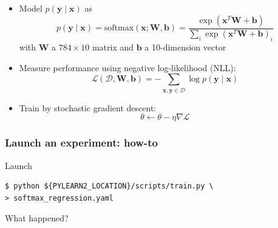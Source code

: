 \documentclass[mathserif, xcolor=dvipsnames]{beamer}
\begin{document}
\begin{frame}[t]
    \begin{itemize}\addtolength{\itemsep}{0.5\baselineskip}
        \item{
            Model $p(\mathbf{y} \mid \mathbf{x})$ as
            \begin{equation*}
                p(\mathbf{y} \mid \mathbf{x})
                = \text{softmax}(\mathbf{x}; \mathbf{W}, \mathbf{b})
                = \frac{\exp(\mathbf{x}^T \mathbf{W} + \mathbf{b})}
                       {\sum_i \exp(\mathbf{x}^T \mathbf{W} + \mathbf{b})_i}
            \end{equation*}
            with $\mathbf{W}$ a $784 \times 10$ matrix and $\mathbf{b}$ a
            10-dimension vector
        }
        \item{
            Measure performance using negative log-likelihood (NLL):
            \begin{equation*}
                \mathcal{L}(\mathcal{D}, \mathbf{W}, \mathbf{b})
                = -\sum_{\mathbf{x}, \mathbf{y} \in \mathcal{D}}
                    \log p(\mathbf{y} \mid \mathbf{x})
            \end{equation*}
        }
        \item{
            Train by stochastic gradient descent:
            \begin{equation*}
                \theta \gets \theta - \eta \nabla \mathcal{L}
            \end{equation*}
        }
    \end{itemize}
\end{frame}

\begin{frame}[fragile]
\frametitle{Launch an experiment: how-to}
\begin{center}
{\Huge Launch}

\vspace{1cm}

\lstset{escapechar=@, language=bash}
\begin{lstlisting}
$ python ${PYLEARN2_LOCATION}/scripts/train.py \
> softmax_regression.yaml
\end{lstlisting}

\vspace{1cm}

{\Huge What happened?}
\end{center}

\end{frame}
\end{document}
